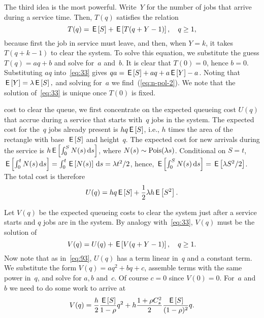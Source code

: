 \documentclass[stochastic-or.tex]{subfiles}
\begin{document}
The third idea is the most powerful.
Write~$Y$ for the number of jobs that arrive during a service time.
Then, $T(q)$ satisfies the relation
\begin{equation}\label{eq:33}
  T(q) = \,\mathsf{E}\left[S\right] + \,\mathsf{E}\left[T(q+Y-1)\right],\quad q\geq 1,
\end{equation}
because first the job in service must leave, and then, when $Y=k$, it takes $T(q+k-1)$ to clear the system.
To solve this equation, we substitute the guess $T(q) = aq+b$ and solve for~$a$ and~$b$.
It is clear that $T(0)=0$, hence $b=0$.
Substituting $a q$ into~\cref{eq:33} gives $q a =\,\mathsf{E}\left[S\right] + aq + a\,\mathsf{E}\left[Y\right] - a$.
Noting that $\,\mathsf{E}\left[Y\right] = \lambda \,\mathsf{E}\left[S\right],$ and solving for~$a$ we find~(\cref{eq:n-pol-2}).
We note that the solution of~\cref{eq:33} is unique once $T(0)$ is fixed.




 cost to clear the queue, we first concentrate on the expected queueing cost $U(q)$ that accrue during a service that starts with~$q$ jobs in the system.
The expected cost for the~$q$ jobs already present is $h q \,\mathsf{E}\left[S\right]$, i.e., $h$ times the area of the rectangle with base~$\,\mathsf{E}\left[S\right]$ and height~$q$.
The expected cost for new arrivals during the service is $h \,\mathsf{E}\left[\int_0^{S} N(s) \,\textrm{d}s\right]$, where $N(s)\sim \mathrm{Pois}(\lambda s)$.
Conditional on $S=t$, $\,\mathsf{E}\left[\int_0^{t} N(s) \,\textrm{d}s \right] = \int_{0}^{t} \,\mathsf{E}\left[N(s)\right] \,\textrm{d}s = \lambda t^2/2$, hence, $\,\mathsf{E}\left[\int_0^{S} N(s) \,\textrm{d}s\right] = \,\mathsf{E}\left[\lambda S^{2}/2\right]$.
The total cost is therefore
\begin{equation*}
U(q)  =  h q \,\mathsf{E}\left[S\right] +  \frac 12 \lambda h \,\mathsf{E}\left[S^2\right].
\end{equation*}

Let $V(q)$ be the expected queueing costs to clear the system just after a service starts and  $q$ jobs are in the system.
By analogy with~\cref{eq:33}, $V(q)$ must be the solution of
\begin{equation}  \label{eq:98}
  V(q) = U(q) + \,\mathsf{E}\left[V(q+Y-1)\right], \quad q\geq 1.
\end{equation}
Now note that as in~\cref{eq:93}, $U(q)$ has a term linear in~$q$ and a constant term.
We substitute the form $V(q) = aq^2 + bq+c$, assemble terms with the same power in~$q$, and solve for $a, b$ and~$c$.
Of course $c = 0$ since $V(0)=0$.
For~$a$ and~$b$ we need to do some work to arrive at
\begin{align*}
  V(q) = \frac{h}{2}\frac{\,\mathsf{E}\left[S\right]}{1-\rho} q^2 + h  \frac{ 1+ \rho C_s^2}2 \frac{\,\mathsf{E}\left[S\right]}{(1-\rho)^2} q.
\end{align*}
\end{document}
